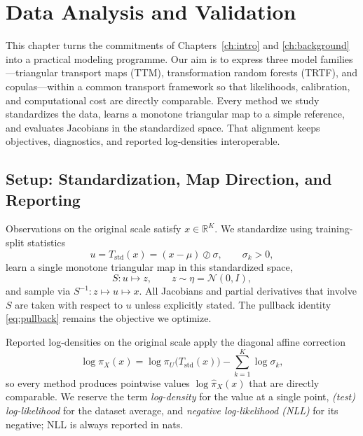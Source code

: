 \documentclass[11pt,a4paper,twoside]{book}\usepackage[]{graphicx}\usepackage[]{xcolor}
\begin{document}




\chapter{Data Analysis and Validation}\label{ch:dataanalysis}

This chapter turns the commitments of Chapters~\ref{ch:intro} and \ref{ch:background} into a practical modeling programme. Our aim is to express three model families---triangular transport maps (TTM), transformation random forests (TRTF), and copulas---within a common transport framework so that likelihoods, calibration, and computational cost are directly comparable. Every method we study standardizes the data, learns a monotone triangular map to a simple reference, and evaluates Jacobians in the standardized space. That alignment keeps objectives, diagnostics, and reported log-densities interoperable.

\section{Setup: Standardization, Map Direction, and Reporting}\label{sec:setup}

Observations on the original scale satisfy $x\in\mathbb{R}^K$. We standardize using training-split statistics
\begin{equation}
  u = T_{\mathrm{std}}(x) = (x-\mu)\oslash\sigma,
  \qquad \sigma_k > 0,
  \label{eq:standardization}
\end{equation}
learn a single monotone triangular map in this standardized space,
\begin{equation}
  S: u \longmapsto z, \qquad z \sim \eta = \mathcal{N}(0,I),
  \label{eq:map-direction}
\end{equation}
and sample via $S^{-1}: z \mapsto u \mapsto x$. All Jacobians and partial derivatives that involve $S$ are taken with respect to $u$ unless explicitly stated. The pullback identity \eqref{eq:pullback} remains the objective we optimize.

Reported log-densities on the original scale apply the diagonal affine correction
\begin{equation}
  \log \pi_X(x) = \log \pi_U\!\big(T_{\mathrm{std}}(x)\big) - \sum_{k=1}^K \log \sigma_k,
  \label{eq:affine-correction}
\end{equation}
so every method produces pointwise values $\log \hat\pi_X(x)$ that are directly comparable. We reserve the term \emph{log-density} for the value at a single point, \emph{(test) log-likelihood} for the dataset average, and \emph{negative log-likelihood (NLL)} for its negative; NLL is always reported in nats.
\end{document}
